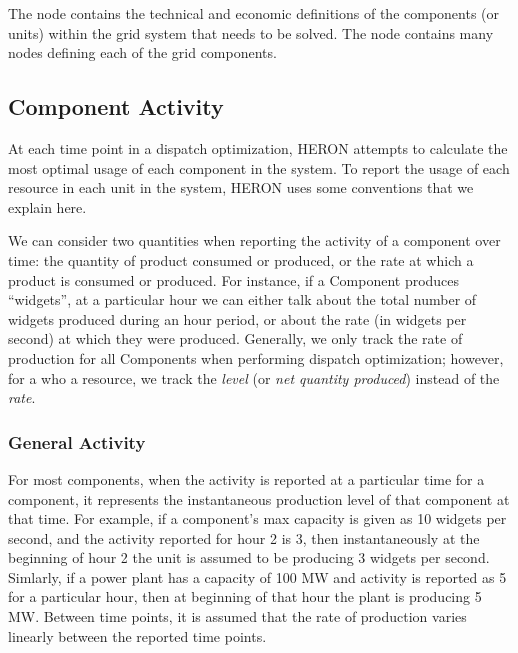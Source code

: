 The  node contains the technical and economic definitions of the components (or
units) within the grid system that needs to be solved. The  node contains many
 nodes defining each of the grid components.

\subsection{Component Activity}
At each time point in a dispatch optimization, HERON attempts to calculate the most optimal usage of
each component in the system. To report the usage of each resource in each unit in the system, HERON
uses some conventions that we explain here.

We can consider two quantities when reporting the activity of a component over time: the quantity of
product consumed or produced, or the rate at which a product is consumed or produced. For instance,
if a Component produces ``widgets'', at a particular hour we can either talk about the total number
of widgets produced during an hour period, or about the rate (in widgets per second) at which they
were produced. Generally, we only track the rate of production for all Components when performing
dispatch optimization; however, for a  who  a resource, we track
the \emph{level} (or \emph{net quantity produced}) instead of the \emph{rate}.

\subsubsection{General Activity}
For most components, when the activity is reported at a particular time for a component, it
represents the instantaneous production level of that component at that time. For example, if a
component's max capacity is given as 10 widgets per second, and the activity reported for hour 2 is
3, then instantaneously at the beginning of hour 2 the unit is assumed to be producing 3 widgets per
second. Simlarly, if a power plant has a capacity of 100 MW and activity is reported as 5 for a
particular hour, then at beginning of that hour the plant is producing 5 MW. Between time points, it
is assumed that the rate of production varies linearly between the reported time points.

